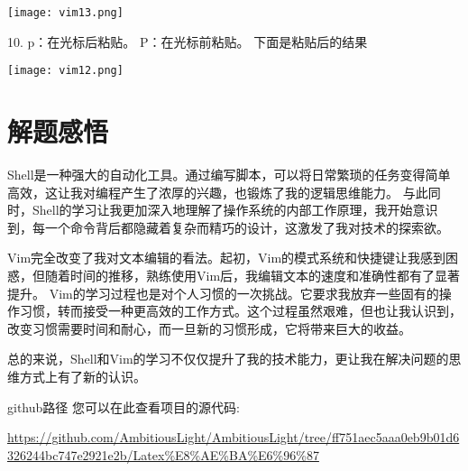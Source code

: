 \documentclass{article}
\begin{document}
\noindent
\begin{minipage}{\linewidth}
 \centering
  \texttt{[image: vim13.png]}
  \label{fig:example}
\end{minipage}


10.
p：在光标后粘贴。
P：在光标前粘贴。
下面是粘贴后的结果

\noindent
\begin{minipage}{\linewidth}
 \centering
  \texttt{[image: vim12.png]}
  \label{fig:example}
\end{minipage}




\section{解题感悟}
Shell是一种强大的自动化工具。通过编写脚本，可以将日常繁琐的任务变得简单高效，这让我对编程产生了浓厚的兴趣，也锻炼了我的逻辑思维能力。
与此同时，Shell的学习让我更加深入地理解了操作系统的内部工作原理，我开始意识到，每一个命令背后都隐藏着复杂而精巧的设计，这激发了我对技术的探索欲。

Vim完全改变了我对文本编辑的看法。起初，Vim的模式系统和快捷键让我感到困惑，但随着时间的推移，熟练使用Vim后，我编辑文本的速度和准确性都有了显著提升。
Vim的学习过程也是对个人习惯的一次挑战。它要求我放弃一些固有的操作习惯，转而接受一种更高效的工作方式。这个过程虽然艰难，但也让我认识到，改变习惯需要时间和耐心，而一旦新的习惯形成，它将带来巨大的收益。

总的来说，Shell和Vim的学习不仅仅提升了我的技术能力，更让我在解决问题的思维方式上有了新的认识。

github路径
您可以在此查看项目的源代码: 

\url{https://github.com/AmbitiousLight/AmbitiousLight/tree/ff751aec5aaa0eb9b01d6326244bc747e2921e2b/Latex%E8%AE%BA%E6%96%87}
\end{document}
